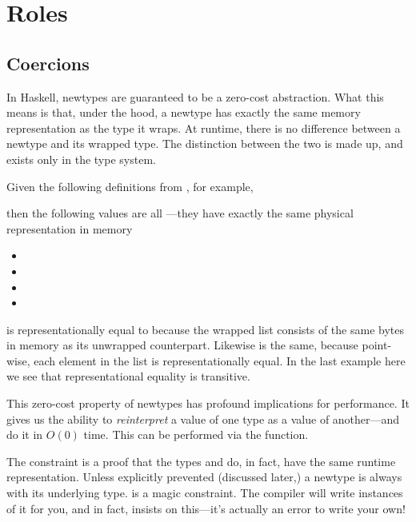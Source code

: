 \documentclass[book.tex]{subfiles}
\begin{document}
\chapter{Roles}

\section{Coercions}


In Haskell, newtypes are guaranteed to be a zero-cost abstraction. What this
means is that, under the hood, a newtype has exactly the same memory
representation as the type it wraps. At runtime, there is no difference between
a newtype and its wrapped type. The distinction between the two is made up, and
exists only in the type system.

Given the following definitions from , for example,


then the following values are all ---they have
exactly the same physical representation in memory

\begin{itemize}
  \item{\hsval{[54, 46]}}
  \item{}
  \item{}
  \item{}
\end{itemize}

 is representationally equal to \hsval{[54, 46]} because
the wrapped list consists of the same bytes in memory as its unwrapped
counterpart. Likewise  is the same, because point-wise,
each element in the list is representationally equal. In the last example here
we see that representational equality is transitive.

This zero-cost property of newtypes has profound implications for performance.
It gives us the ability to \emph{reinterpret} a value of one type as a value of
another---and do it in $O(0)$ time. This can be performed via the 
function.


The   constraint is a proof that the types
 and  do, in fact, have the same runtime representation. Unless
explicitly prevented (discussed later,) a newtype is always  with
its underlying type.   is a magic constraint. The compiler will
write instances of it for you, and in fact, insists on this---it's actually an
error to write your own!
\end{document}
